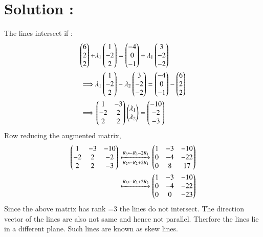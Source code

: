 \documentclass[journal,12pt,twocolumn]{IEEEtran}
\begin{document}
\section{Solution :}
The lines intersect if :
\begin{align}
	\begin{pmatrix}6\\2\\2\end{pmatrix} +& \lambda_1\begin{pmatrix}1\\-2\\2\end{pmatrix} 
		= \begin{pmatrix}-4\\0\\-1\end{pmatrix} + \lambda_1\begin{pmatrix}3\\-2\\-2\end{pmatrix}	\\
	\implies & \lambda_1\begin{pmatrix}1\\-2\\2\end{pmatrix} - \lambda_2\begin{pmatrix}3\\-2\\-2\end{pmatrix} 
		= \begin{pmatrix}-4\\0\\-1\end{pmatrix} - \begin{pmatrix}6\\2\\2\end{pmatrix} 			\\
	\implies & \begin{pmatrix}1 & -3\\-2 & 2\\2 & 2\end{pmatrix}\begin{pmatrix}\lambda_1 \\ \lambda_2\end{pmatrix} 
		= \begin{pmatrix}-10\\-2\\-3\end{pmatrix}
\end{align}
Row reducing the augmented matrix,
\begin{align}
	\begin{pmatrix}1  & -3 & -10 \\ -2 & 2 & -2 \\ 2 & 2 & -3\end{pmatrix} 
	\xleftrightarrow[R_2 \leftarrow R_2+2R_1]{R_3 \leftarrow R_3-2R_1}
		\begin{pmatrix}1  & -3 & -10 \\ 0 & -4 & -22 \\ 0 & 8 & 17\end{pmatrix}  \\
	\xleftrightarrow[]{R_3 \leftarrow R_3+2R_2}
		\begin{pmatrix}1  & -3 & -10 \\ 0 & -4 & -22 \\ 0 & 0 & -23\end{pmatrix} 
\end{align}
Since the above matrix has rank =3 the lines do not intersect. The direction vector of the lines are also not same and hence not parallel. Therfore the lines lie in a different plane. Such lines are known as skew lines.
\end{document}

